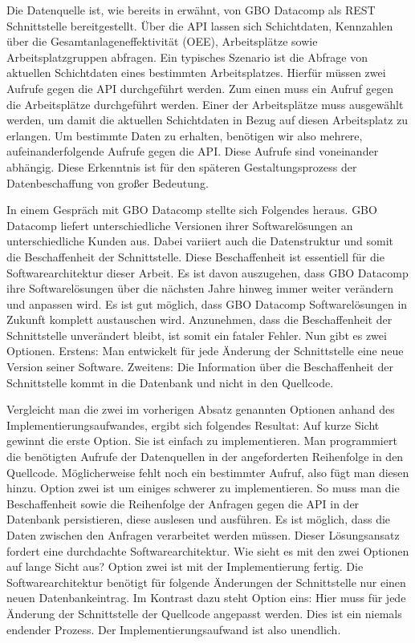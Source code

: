 Die Datenquelle ist, wie bereits in  erwähnt, von GBO Datacomp als REST Schnittstelle
bereitgestellt. Über die API lassen sich Schichtdaten, Kennzahlen über die Gesamtanlageneffektivität (OEE), Arbeitsplätze
sowie Arbeitsplatzgruppen abfragen. Ein typisches Szenario ist die Abfrage von aktuellen Schichtdaten eines bestimmten
Arbeitsplatzes. Hierfür müssen zwei Aufrufe gegen die API durchgeführt werden. Zum einen muss ein Aufruf gegen die
Arbeitsplätze durchgeführt werden. Einer der Arbeitsplätze muss ausgewählt werden, um damit die aktuellen Schichtdaten
in Bezug auf diesen Arbeitsplatz zu erlangen. Um bestimmte Daten zu erhalten, benötigen wir also mehrere, aufeinanderfolgende
Aufrufe gegen die API. Diese Aufrufe sind voneinander abhängig. Diese Erkenntnis ist für den späteren Gestaltungsprozess
der Datenbeschaffung von großer Bedeutung.

In einem Gespräch mit GBO Datacomp stellte sich Folgendes heraus. GBO Datacomp liefert unterschiedliche Versionen ihrer
Softwarelösungen an unterschiedliche Kunden aus. Dabei variiert auch die Datenstruktur und somit die Beschaffenheit der
Schnittstelle. Diese Beschaffenheit ist essentiell für die Softwarearchitektur dieser Arbeit. Es ist davon auszugehen,
dass GBO Datacomp ihre Softwarelösungen über die nächsten Jahre hinweg immer weiter verändern und anpassen wird.
Es ist gut möglich, dass GBO Datacomp Softwarelösungen in Zukunft komplett austauschen wird. Anzunehmen,
dass die Beschaffenheit der Schnittstelle unverändert bleibt, ist somit ein fataler Fehler. Nun gibt es zwei Optionen.
Erstens: Man entwickelt für jede Änderung der Schnittstelle eine neue Version seiner Software. Zweitens:
Die Information über die Beschaffenheit der Schnittstelle kommt in die Datenbank und nicht in den
Quellcode.

Vergleicht man die zwei im vorherigen Absatz genannten Optionen anhand des Implementierungsaufwandes,
ergibt sich folgendes Resultat: Auf kurze Sicht gewinnt die erste Option. Sie ist einfach zu implementieren.
Man programmiert die benötigten Aufrufe der Datenquellen in der angeforderten Reihenfolge in den Quellcode.
Möglicherweise fehlt noch ein bestimmter Aufruf, also fügt man diesen hinzu.
Option zwei ist um einiges schwerer zu implementieren. So muss man die Beschaffenheit sowie die Reihenfolge der Anfragen
gegen die API in der Datenbank persistieren, diese auslesen und ausführen. Es ist möglich, dass die Daten zwischen den
Anfragen verarbeitet werden müssen. Dieser Lösungsansatz fordert eine durchdachte Softwarearchitektur. Wie sieht es mit den
zwei Optionen auf lange Sicht aus? Option zwei ist mit der Implementierung fertig. Die Softwarearchitektur
benötigt für folgende Änderungen der Schnittstelle nur einen neuen Datenbankeintrag. Im Kontrast dazu steht Option eins:
Hier muss für jede Änderung der Schnittstelle der Quellcode angepasst werden. Dies ist ein niemals endender Prozess.
Der Implementierungsaufwand ist also unendlich.

